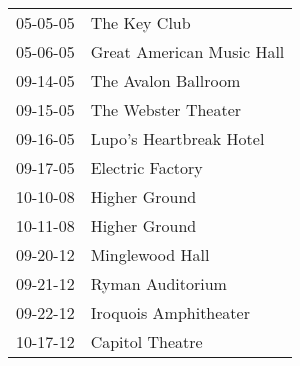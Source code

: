 \begin{supertabular}{p{0.25\columnwidth}p{0.75\columnwidth}}
 05-05-05 &               The Key Club \\
 05-06-05 &  Great American Music Hall \\
 09-14-05 &        The Avalon Ballroom \\
 09-15-05 &        The Webster Theater \\
 09-16-05 &    Lupo's Heartbreak Hotel \\
 09-17-05 &           Electric Factory \\
 10-10-08 &              Higher Ground \\
 10-11-08 &              Higher Ground \\
 09-20-12 &            Minglewood Hall \\
 09-21-12 &           Ryman Auditorium \\
 09-22-12 &      Iroquois Amphitheater \\
 10-17-12 &            Capitol Theatre \\
\end{supertabular}
